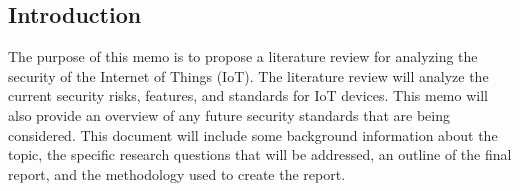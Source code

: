 \documentclass[letterpaper, 12pt]{texMemo}
\begin{document}
\maketitle
\begin{flushleft}
\subsection*{Introduction}
The purpose of this memo is to propose a literature review for analyzing the security of the Internet of Things (IoT). 
The literature review will analyze the current security risks, features, and standards for IoT devices. This memo will also provide
an overview of any future security standards that are being considered.
This document will include some background information about the topic, the specific research questions that will be addressed, an outline of
the final report, and the methodology used to create the report.


\end{flushleft}
\end{document}
